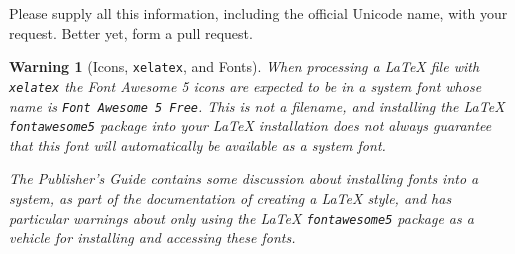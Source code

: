 \documentclass{sn-jnl}
\theoremstyle{thmstyleone}%
\theoremstyle{thmstyletwo}%
\theoremstyle{thmstylethree}%
\newtheorem{warning}[theorem]{Warning}
\newcommand{\mono}[1]{\texttt{#1}}
\numberwithin{equation}{section}
\begin{document}
Please supply all this information, including the official Unicode name, with your request.  Better yet, form a pull request.%
\begin{warning}[Icons, \mono{xelatex}, and Fonts]\label{subsection-icons-in-text-7}%
%
When processing a \LaTeX{} file with \mono{xelatex} the Font Awesome 5 icons are expected to be in a \emph{system} font whose name is \mono{Font Awesome 5 Free}.  This is not a filename, and installing the \LaTeX{} \mono{fontawesome5} package into your \LaTeX{} installation does not always guarantee that this font will automatically be available as a \emph{system} font.%
\par
The Publisher's Guide contains some discussion about installing fonts into a system, as part of the documentation of creating a \LaTeX{} style, and has particular warnings about only using the \LaTeX{} \mono{fontawesome5} package as a vehicle for installing and accessing these fonts.%
\end{warning}
%
%
\typeout{************************************************}
\typeout{************************************************}
%
\end{document}
